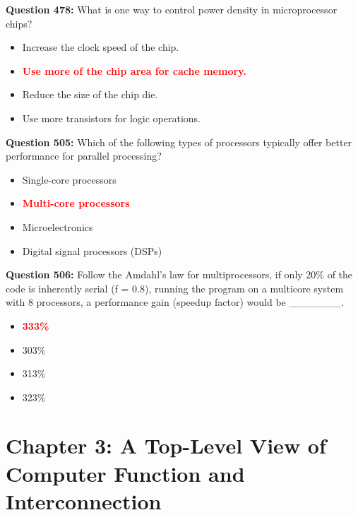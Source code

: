 \documentclass[12pt,a4paper]{article}
\begin{document}
\vspace{0.5cm}

\textbf{Question 478:} What is one way to control power density in microprocessor chips?

\begin{itemize}
    \item[\textbf{A.}] Increase the clock speed of the chip.
    \item[\textbf{B.}] \textcolor{red}{\textbf{Use more of the chip area for cache memory.}}
    \item[\textbf{C.}] Reduce the size of the chip die.
    \item[\textbf{D.}] Use more transistors for logic operations.
\end{itemize}

\vspace{0.5cm}

\textbf{Question 505:} Which of the following types of processors typically offer better performance for parallel processing?

\begin{itemize}
    \item[\textbf{A.}] Single-core processors
    \item[\textbf{B.}] \textcolor{red}{\textbf{Multi-core processors}}
    \item[\textbf{C.}] Microelectronics
    \item[\textbf{D.}] Digital signal processors (DSPs)
\end{itemize}

\vspace{0.5cm}

\textbf{Question 506:} Follow the Amdahl's law for multiprocessors, if only 20\% of the code is inherently serial (f = 0.8), running the program on a multicore system with 8 processors, a performance gain (speedup factor) would be _______.

\begin{itemize}
    \item[\textbf{A.}] \textcolor{red}{\textbf{333\%}}
    \item[\textbf{B.}] 303\%
    \item[\textbf{C.}] 313\%
    \item[\textbf{D.}] 323\%
\end{itemize}

\vspace{0.5cm}

\section{Chapter 3: A Top-Level View of Computer Function and Interconnection}
\end{document}
